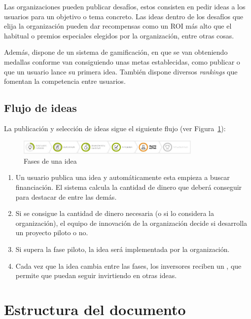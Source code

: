  Las organizaciones pueden publicar desafíos, estos consisten en pedir ideas a los usuarios para un 
 objetivo o tema concreto. Las ideas dentro de los desafíos que elija la organización pueden dar 
 recompensas como un \acs{ROI} más alto que el habitual o premios especiales elegidos
 por la organización, entre otras cosas.
  
  Además, dispone de un sistema de gamificación, en que se van obteniendo medallas conforme van
  consiguiendo unas metas establecidas, como publicar o que un usuario lance su primera idea. También
   dispone diversos \textit{rankings} que fomentan la competencia entre usuarios.
   
 \subsection{Flujo de ideas}
 
 La publicación y selección de ideas sigue el siguiente flujo (ver Figura~\ref{fig:flujo}):
 
 \begin{figure}[!h]
 \begin{center}
 \includegraphics[width=0.8\textwidth]{./img/introduccion/flujo.png}
 \caption{Fases de una idea}
 \label{fig:flujo}
 \end{center}
 \end{figure}
 
 \begin{enumerate}
 	\item Un usuario publica una idea y automáticamente esta empieza a buscar financiación. El sistema calcula la cantidad de dinero que deberá conseguir para destacar de entre las demás.
 	\item Si se consigue la cantidad de dinero necesaria (o si lo considera la organización), el equipo de
 	 innovación de la organización decide si desarrolla un proyecto piloto o no.
 	 \item Si supera la fase piloto, la idea será implementada por la organización.
 	 \item Cada vez que la idea cambia entre las fases, los inversores reciben un , que permite
 	 que puedan seguir invirtiendo en otras ideas.
 \end{enumerate}
 
  
 
\section{Estructura del documento}

